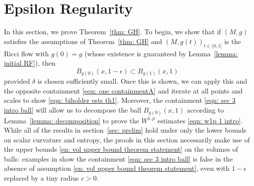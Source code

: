 \documentclass[11pt,reqno]{amsart}
\theoremstyle{remark}
\theoremstyle{definition}
\numberwithin{equation}{section}
\newcommand{\e}{{\epsilon}}
\begin{document}
\section{Epsilon Regularity}
In this section, we prove Theorem~\ref{thm: GH}.
To begin,  we show that if $(M,g)$ satisfies the assumptions of Theorem~\ref{thm: GH} and $(M,g(t))_{t \in (0,1]}$ is the Ricci flow with $g(0)=g$ (whose existence is guaranteed by Lemma~\ref{lemma: initial RF}), then 
\begin{equation}
	\label{eqn: sec 3 intro ball}
B_{g(0)}(x,1-\e) \subset B_{g(1)}(x, 1)
\end{equation}
 provided $\delta$ is chosen sufficiently small. 
 Once this is shown, we can apply this and the opposite containment \eqref{eqn: one containmentA} and iterate at all points and scales to show \eqref{eqn: biholder ests th1}. Moreover, the containment \eqref{eqn: sec 3 intro ball} will  allow us to decompose the ball $B_{g(0)}(x, 1)$ according to Lemma~\ref{lemma: decomposition} to prove the $W^{1,p}$ estimates \eqref{eqn: w1p 1 intro}. While all of the results in section~\ref{sec: prelim} hold under only the lower bounds on scalar curvature and entropy, the proofs in this section necessarily make use of the upper bounds \eqref{en: vol upper bound theorem statement}
on the volumes of balls: examples in \cite{LNN1, LNNSurvey} show the containment \eqref{eqn: sec 3 intro ball} is false  in the absence of assumption \eqref{en: vol upper bound theorem statement}, even with $1-\e$ replaced by a tiny radius $c>0$.
\end{document}
